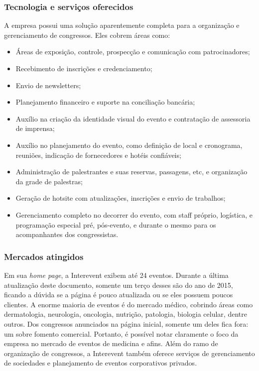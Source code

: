 \documentclass[12pt,a4paper,twoside,hyphens,english,brazil]{abntex2}
\begin{document}
\subsubsection*{Tecnologia e serviços oferecidos}
A empresa possui uma solução aparentemente completa para a organização e gerenciamento de congressos. Eles cobrem áreas como:
\begin{itemize}[itemsep=-1ex]
	\item Áreas de exposição, controle, prospecção e comunicação com patrocinadores;
	\item Recebimento de inscrições e credenciamento;
	\item Envio de newsletters;
	\item Planejamento financeiro e suporte na conciliação bancária;
	\item Auxílio na criação da identidade visual do evento e contratação de assessoria de imprensa;
	\item Auxílio no planejamento do evento, como definição de local e cronograma, reuniões, indicação de fornecedores e hotéis confiáveis;
	\item Administração de palestrantes e suas reservas, passagens, etc, e organização da grade de palestras;
	\item Geração de hotsite com atualizações, inscrições e envio de trabalhos;
	\item Gerenciamento completo no decorrer do evento, com staff próprio, logística, e programação especial pré, pós-evento, e durante o mesmo para os acompanhantes dos congressistas.
\end{itemize}

\subsubsection*{Mercados atingidos}
Em sua \emph{home page}\cite{interevent}, a Interevent exibem até 24 eventos. Durante a última atualização deste documento, somente um terço desses são do ano de 2015, ficando a dúvida se a página é pouco atualizada ou se eles possuem poucos clientes. A enorme maioria de eventos é do mercado médico, cobrindo áreas como dermatologia, neurologia, oncologia, nutrição, patologia, biologia celular, dentre outros. Dos congressos anunciados na página inicial, somente um deles fica fora: um sobre fomento comercial. Portanto, é possível notar claramente o foco da empresa no mercado de eventos de medicina e afins. Além do ramo de organização de congressos, a Interevent também oferece serviços de gerenciamento de sociedades e planejamento de eventos corporativos privados.
\end{document}
